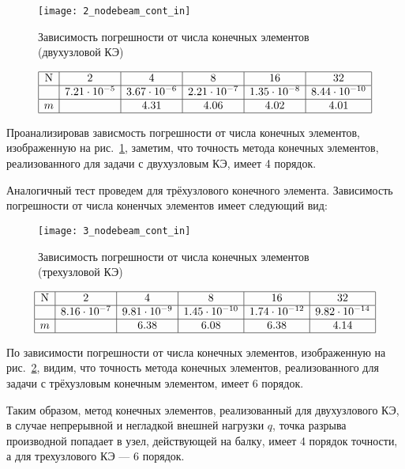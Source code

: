 \documentclass[12pt,a4paper]{article}
\begin{document}
\begin{figure}[H]
		\centering
		\texttt{[image: 2\_nodebeam\_cont\_in]}
		\caption{Зависимость погрешности от числа конечных элементов (двухузловой КЭ)}
		\label{fig:2_nodebeam_cont_in}
\end{figure}


	
\[
\begin{array}{|c|c|c|c|c|c|}
\hline
\text{N} & 2 & 4 & 8 & 16 & 32 \\ \hline
\Delta  & 7.21 \cdot 10^{-5} & 3.67 \cdot 10^{-6} & 2.21 \cdot 10^{-7} & 1.35 \cdot 10^{-8} & 8.44 \cdot 10^{-10}\\ \hline
m  &  & 4.31 & 4.06 & 4.02 & 4.01 \\ 
\hline
\end{array}
\]



Проанализировав зависмость погрешности от числа конечных элементов, изображенную на рис.~\ref{fig:2_nodebeam_cont_in}, заметим, что точность метода конечных элементов, реализованного для задачи с двухузловым КЭ, имеет 4 порядок. 

Аналогичный тест проведем для трёхузлового конечного элемента. Зависимость погрешности от числа коненчых элементов имеет следующий вид: \\
\begin{figure}[H]
		\centering
		\texttt{[image: 3\_nodebeam\_cont\_in]}
		\caption{Зависимость погрешности от числа конечных элементов (трехузловой КЭ)}
		\label{fig:3_nodebeam_cont_in}
\end{figure}


	
\[
\begin{array}{|c|c|c|c|c|c|}
\hline
\text{N} & 2 & 4 & 8 & 16 & 32\\ \hline
\Delta  & 8.16 \cdot 10^{-7} & 9.81 \cdot 10^{-9} & 1.45 \cdot 10^{-10} & 1.74 \cdot 10^{-12} & 9.82 \cdot 10^{-14}\\ \hline
m &  & 6.38 & 6.08 & 6.38 & 4.14 \\ 
\hline
\end{array}
\]

По зависимости погрешности от числа конечных элементов, изображенную на рис.~\ref{fig:3_nodebeam_cont_in}, видим, что точность метода конечных элементов, реализованного для задачи с трёхузловым конечным элементом, имеет 6 порядок. 

Таким образом, метод конечных элементов, реализованный для двухузлового КЭ, в случае непрерывной и негладкой внешней нагрузки $q$, точка разрыва производной попадает в узел, действующей на балку, имеет 4 порядок точности, а для трехузлового КЭ --- 6 порядок. \\
\end{document}
